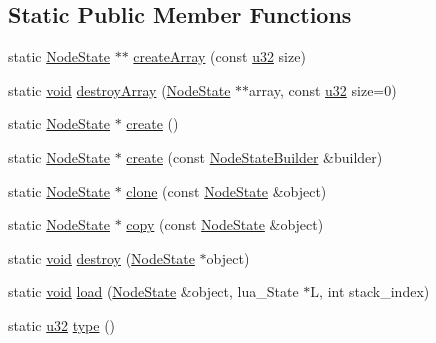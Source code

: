 \subsection*{Static Public Member Functions}
\begin{DoxyCompactItemize}
\item 
static \mbox{\hyperlink{classnjli_1_1_node_state}{Node\+State}} $\ast$$\ast$ \mbox{\hyperlink{classnjli_1_1_node_state_a46f4eb5ad4b0cb11d454d2e17e88f07c}{create\+Array}} (const \mbox{\hyperlink{_util_8h_a10e94b422ef0c20dcdec20d31a1f5049}{u32}} size)
\item 
static \mbox{\hyperlink{_thread_8h_af1e856da2e658414cb2456cb6f7ebc66}{void}} \mbox{\hyperlink{classnjli_1_1_node_state_a6f2ce1a2b1a3ad475cd4b8b23321533e}{destroy\+Array}} (\mbox{\hyperlink{classnjli_1_1_node_state}{Node\+State}} $\ast$$\ast$array, const \mbox{\hyperlink{_util_8h_a10e94b422ef0c20dcdec20d31a1f5049}{u32}} size=0)
\item 
static \mbox{\hyperlink{classnjli_1_1_node_state}{Node\+State}} $\ast$ \mbox{\hyperlink{classnjli_1_1_node_state_a00caefaec4d9b4a16c76d6020882f720}{create}} ()
\item 
static \mbox{\hyperlink{classnjli_1_1_node_state}{Node\+State}} $\ast$ \mbox{\hyperlink{classnjli_1_1_node_state_ab1379ea6f6b5fb0d7c5a38fbeaca7bc5}{create}} (const \mbox{\hyperlink{classnjli_1_1_node_state_builder}{Node\+State\+Builder}} \&builder)
\item 
static \mbox{\hyperlink{classnjli_1_1_node_state}{Node\+State}} $\ast$ \mbox{\hyperlink{classnjli_1_1_node_state_a803f15ad59bfb455e70e159a9ab7912d}{clone}} (const \mbox{\hyperlink{classnjli_1_1_node_state}{Node\+State}} \&object)
\item 
static \mbox{\hyperlink{classnjli_1_1_node_state}{Node\+State}} $\ast$ \mbox{\hyperlink{classnjli_1_1_node_state_abcdb692c2ef398c1f3d946a60105d549}{copy}} (const \mbox{\hyperlink{classnjli_1_1_node_state}{Node\+State}} \&object)
\item 
static \mbox{\hyperlink{_thread_8h_af1e856da2e658414cb2456cb6f7ebc66}{void}} \mbox{\hyperlink{classnjli_1_1_node_state_a0de1bbd47e3cdbb87fcb81ecae81c2c7}{destroy}} (\mbox{\hyperlink{classnjli_1_1_node_state}{Node\+State}} $\ast$object)
\item 
static \mbox{\hyperlink{_thread_8h_af1e856da2e658414cb2456cb6f7ebc66}{void}} \mbox{\hyperlink{classnjli_1_1_node_state_a5f4bfdcec42cd5a9baab7754d0ef09c8}{load}} (\mbox{\hyperlink{classnjli_1_1_node_state}{Node\+State}} \&object, lua\+\_\+\+State $\ast$L, int stack\+\_\+index)
\item 
static \mbox{\hyperlink{_util_8h_a10e94b422ef0c20dcdec20d31a1f5049}{u32}} \mbox{\hyperlink{classnjli_1_1_node_state_ad73f8c965c1ad03441d1c1d07d6442b5}{type}} ()
\end{DoxyCompactItemize}
